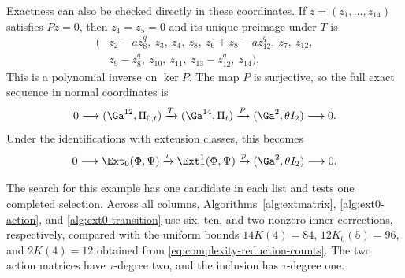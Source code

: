 Exactness can also be checked directly in these coordinates.
If $z=(z_1,\ldots,z_{14})$ satisfies $Pz=0$, then
$z_1=z_5=0$ and its unique preimage under $T$ is
\[
\begin{aligned}
 (&z_2-a z_8^q,\ z_3,\ z_4,\ z_8,\
   z_6+z_8-a z_{12}^q,\ z_7,\ z_{12},\\
  &z_9-z_8^q,\ z_{10},\ z_{11},\
   z_{13}-z_{12}^q,\ z_{14}).
\end{aligned}
\]
This is a polynomial inverse on $\ker P$. The map $P$ is
surjective, so the full exact sequence in normal coordinates is
\begin{equation}
 0\longrightarrow(\Ga^{12},\Pi_{0,t})
 \xrightarrow{T}(\Ga^{14},\Pi_t)
 \xrightarrow{P}(\Ga^2,\theta I_2)
 \longrightarrow0.
 \label{eq:large-coordinate-sequence}
\end{equation}
Under the identifications with extension classes, this becomes
\begin{equation}
 0\longrightarrow\Ext_0(\Phi,\Psi)
 \xrightarrow{\iota}\Ext^1_\tau(\Phi,\Psi)
 \xrightarrow{p}(\Ga^2,\theta I_2)
 \longrightarrow0.
 \label{eq:large-extension-sequence}
\end{equation}

The search for this example has one candidate in each
list and tests one completed selection. Across all columns,
Algorithms~\ref{alg:extmatrix}, \ref{alg:ext0-action}, and
\ref{alg:ext0-transition} use six, ten, and two nonzero inner
corrections, respectively, compared with the uniform bounds
$14K(4)=84$, $12K_0(5)=96$, and $2K(4)=12$ obtained from
\eqref{eq:complexity-reduction-counts}. The two action matrices have
$\tau$-degree two, and the inclusion has $\tau$-degree one.
